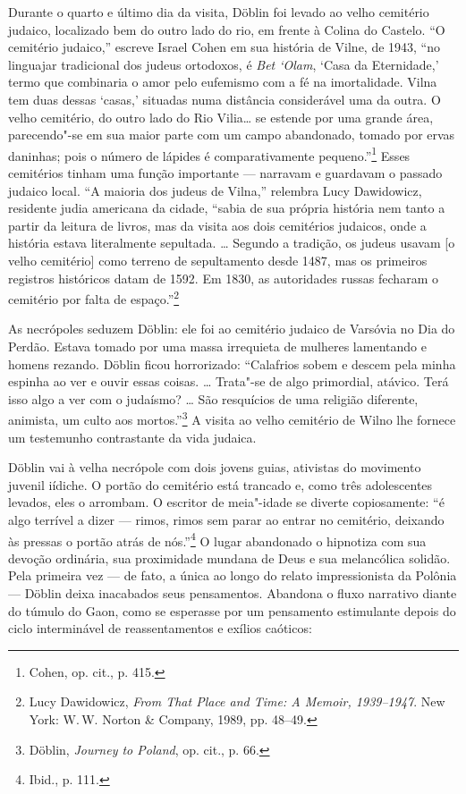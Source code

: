 Durante o quarto e último dia da visita, Döblin foi levado ao velho
cemitério judaico, localizado bem do outro lado do rio, em frente à
Colina do Castelo. ``O cemitério judaico,'' escreve Israel Cohen em sua
história de Vilne, de 1943, ``no linguajar tradicional dos judeus
ortodoxos, é \emph{Bet `Olam}, `Casa da Eternidade,' termo que
combinaria o amor pelo eufemismo com a fé na imortalidade. Vilna tem
duas dessas `casas,' situadas numa distância considerável uma da outra.
O velho cemitério, do outro lado do Rio Vilia\ldots{} se estende por uma
grande área, parecendo"-se em sua maior parte com um campo abandonado,
tomado por ervas daninhas; pois o número de lápides é comparativamente
pequeno.''\footnote{Cohen, op. cit., p. 415.} Esses cemitérios tinham
uma função importante --- narravam e guardavam o passado judaico local.
``A maioria dos judeus de Vilna,'' relembra Lucy Dawidowicz, residente
judia americana da cidade, ``sabia de sua própria história nem tanto a
partir da leitura de livros, mas da visita aos dois cemitérios judaicos,
onde a história estava literalmente sepultada. \ldots{} Segundo a
tradição, os judeus usavam {[}o velho cemitério{]} como terreno de
sepultamento desde 1487, mas os primeiros registros históricos datam de
1592. Em 1830, as autoridades russas fecharam o cemitério por falta de
espaço.''\footnote{Lucy Dawidowicz, \emph{From That Place and Time: A
  Memoir, 1939--1947}. New York: W.\,W. Norton \& Company, 1989, pp.
  48--49.}

As necrópoles seduzem Döblin: ele foi ao cemitério judaico de Varsóvia
no Dia do Perdão. Estava tomado por uma massa irrequieta de mulheres
lamentando e homens rezando. Döblin ficou horrorizado: ``Calafrios sobem
e descem pela minha espinha ao ver e ouvir essas coisas. \ldots{}
Trata"-se de algo primordial, atávico. Terá isso algo a ver com o
judaísmo? \ldots{} São resquícios de uma religião diferente, animista,
um culto aos mortos.''\footnote{Döblin, \emph{Journey to Poland}, op.
  cit., p. 66.} A visita ao velho cemitério de Wilno lhe fornece um
testemunho contrastante da vida judaica.

Döblin vai à velha necrópole com dois jovens guias, ativistas do
movimento juvenil iídiche. O portão do cemitério está trancado e, como
três adolescentes levados, eles o arrombam. O escritor de meia"-idade se
diverte copiosamente: ``é algo terrível a dizer --- rimos, rimos sem parar
ao entrar no cemitério, deixando às pressas o portão atrás de
nós.''\footnote{Ibid., p. 111.} O lugar abandonado o hipnotiza com sua
devoção ordinária, sua proximidade mundana de Deus e sua melancólica
solidão. Pela primeira vez --- de fato, a única ao longo do relato
impressionista da Polônia --- Döblin deixa inacabados seus pensamentos.
Abandona o fluxo narrativo diante do túmulo do Gaon, como se esperasse
por um pensamento estimulante depois do ciclo interminável de
reassentamentos e exílios caóticos:

